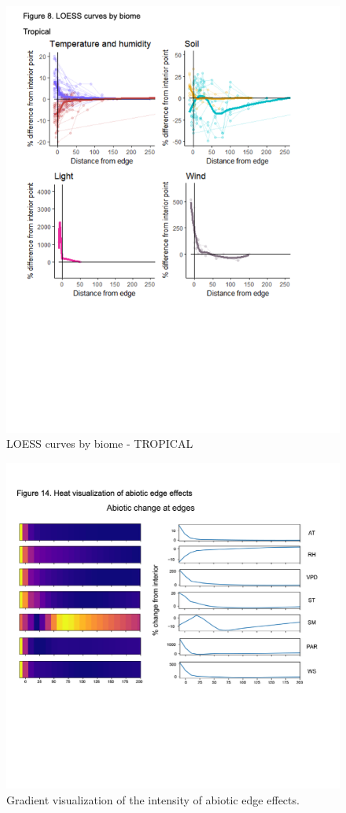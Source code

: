 \documentclass[
  man]{apa6}
\begin{document}
\begin{figure}[H]

{\centering \includegraphics[width=0.8\linewidth,]{images/temp_00006} 

}

\caption{LOESS curves by biome - TROPICAL}\label{fig:loess-trop}
\end{figure}

\begin{figure}[H]

{\centering \includegraphics[width=0.8\linewidth,]{images/temp_00002} 

}

\caption{Gradient visualization of the intensity of abiotic edge effects.}\label{fig:gradient}
\end{figure}
\end{document}
